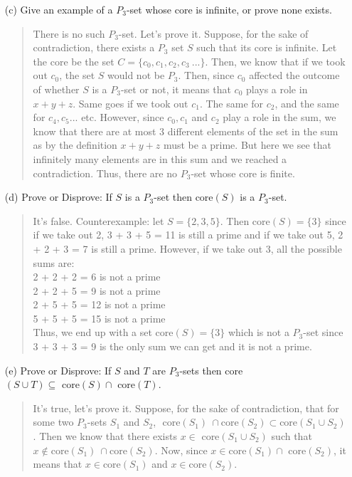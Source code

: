 \documentclass[12pt, a4paper]{article}                      %
\begin{document}
\begin{itemize}
\begin{itemize}
\item[]

\item[(c)]
Give an example of a $P_3$-set whose core is infinite, or prove none exists.
\begin{quote}
There is no such $P_3$-set. Let's prove it. Suppose, for the sake of contradiction, there exists a $P_3$ set $S$ such that its core is infinite. Let the core be the set $C = \{c_0, c_1, c_2, c_3 \ ...\}$.
Then, we know that if we took out $c_0$, the set $S$ would not be $P_3$.
Then, since $c_0$ affected the outcome of whether $S$ is a $P_3$-set or not, it means that $c_0$ plays a role in $x + y + z$. Same goes if we took out $c_1$. The same for $c_2$, and the same for $c_4, c_5...$ etc.
However, since $c_0, c_1$ and $c_2$ play a role in the sum, we know that there are at most 3 different elements of the set in the sum as by the definition $x + y + z$ must be a prime. But here we see that infinitely many elements are in this sum and we reached a contradiction.
Thus, there are no $P_3$-set whose core is finite.
\end{quote}

\item[]

\item[(d)]
Prove or Disprove: If $S$ is a $P_3$-set then core$(S)$ is a $P_3$-set. 
\begin{quote}
It's false. Counterexample: let $S = \{2, 3, 5\}$. Then core$(S) = \{3\}$ since if we take out 2, 3 + 3 + 5 = 11 is still a prime and if we take out 5, 2 + 2 + 3 = 7 is still a prime. However, if we take out 3, all the possible sums are:\\
2 + 2 + 2 = 6 is not a prime\\
2 + 2 + 5 = 9 is not a prime\\
2 + 5 + 5 = 12 is not a prime\\
5 + 5 + 5 = 15 is not a prime\\

Thus, we end up with a set core$(S) = \{3\}$ which is not a $P_3$-set since 3 + 3 + 3 = 9 is the only sum we can get and it is not a prime.
\end{quote}

\item[]

\item[(e)]
Prove or Disprove: If $S$ and $T$ are $P_3$-sets then core$(S \cup T) \subseteq \mbox{ core}(S) \cap \mbox{ core}(T)$.
\begin{quote}
It's true, let's prove it. Suppose, for the sake of contradiction, that for some two $P_3$-sets $S_1$ and $S_2$,
$\mbox{ core}(S_1) \ \cap \mbox{core}(S_2) \subset  \mbox{core}(S_1 \cup S_2)$. Then we know that there exists $x \in$ core$(S_1 \cup S_2)$ such that $x \notin \mbox{core}(S_1) \ \cap \mbox{core}(S_2)$. Now, since $x \in \mbox{core}(S_1) \cap \mbox{ core}(S_2)$, it means that $x \in \mbox{core}(S_1)$ and $x \in \mbox{core}(S_2)$.
\end{quote} 


\end{itemize}
\end{itemize}
\end{document}
